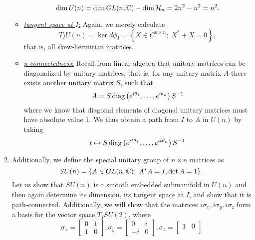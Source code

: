 \documentclass[a4paper, 12pt]{article}
\begin{document}
\begin{Exercise}
\begin{enumerate}[label=(\roman*)]
\begin{itemize}
\[                        \dim U(n) = \dim GL(n, \mathbb{C}) - \dim \mathcal{H}_n = 2n^2 - n^2 = n^2.
                    \]
                \item \underline{\emph{tangent space at $I$}:}
                    Again, we merely calculate
                    \[
                        T_IU(n) = \ker d\phi_I = \left\{ X \in C^{n\times n} ; \; X^* + X = 0 \right\},
                    \]
                    that is, all skew-hermitian matrices.
                \item \underline{\emph{p-connectedness}:}
                    Recall from linear algebra that unitary matrices can be diagonalized by unitary matrices,
                    that is, for any unitary matrix $A$ there exists another unitary matrix $S$, such that
                    \[
                        A = S \operatorname{diag}\left( e^{i\theta_1}, \dots, e^{i\theta_n} \right) S^{-1}
                    \]
                    where we know that diagonal elements of diagonal unitary matrices must have absolute value $1$.
                    We thus obtain a path from $I$ to $A$ in $U(n)$ by taking
                    \[
                        t \mapsto  S \operatorname{diag}\left( e^{it\theta_1}, \dots, e^{it\theta_n} \right) S^{-1}
                    \]
            \end{itemize}
        \item
            Additionally, we define the special unitary group of $n \times n$ matrices as
            \[
                SU(n) = \left\{ A \in GL(n, \mathbb{C}) ; \; A^* A = I, \det A = 1 \right\}.
            \]
            Let us show that $SU(n)$ is a smooth embedded submanifold in $U(n)$ and then again determine its dimension, its tangent space at $I$, and show that it is path-connected.
            Additionally, we will show that the matrices $i\sigma_x, i\sigma_y, i\sigma_z$ form a basis for the vector space $T_ISU(2)$, where
            \[
                \sigma_x =
                \begin{bmatrix}
                    0 & 1 \\
                    1 & 0
                \end{bmatrix},
                \sigma_y =
                \begin{bmatrix}
                    0 & i \\
                    -i& 0
                \end{bmatrix},
                \sigma_z =
                \begin{bmatrix}
                    1 & 0 \\

\end{bmatrix}\]
\end{enumerate}
\end{Exercise}
\end{document}
